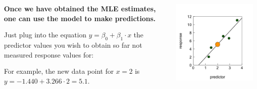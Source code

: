 \documentclass{beamer}
\begin{document}
\begin{frame}
    \frametitle{}
    \begin{columns}
        \begin{column}{0.5\textwidth}
            \textbf{Once we have obtained the MLE estimates, one can use the model to make predictions.}
            \vspace{0.5cm}
    
            Just plug into the equation $y = \beta_0 + \beta_1 \cdot x$ the predictor values you wish to obtain so far not measured response values for:
            \vspace{0.5cm}
            
            For example, the new data point for $x = 2$ is $y = -1.440 + 3.266 \cdot 2 = 5.1$.
        \end{column}
        \begin{column}{0.5\textwidth}
            \includegraphics[width=\textwidth]{lectures/day_2_LM_refresh_I/figures/unnamed-chunk-29-1.png}    
        \end{column}
    \end{columns}
\end{frame}
\end{document}
